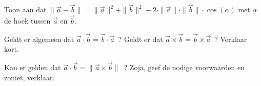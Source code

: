 \documentclass{ximera}
\begin{document}
\begin{exercise}
	Toon aan dat \( \| \vec{a} - \vec{b} \| = \|\vec{a}\|^2 + \|\vec{b}\|^2 - 2 \cdot \|\vec{a}\| \cdot \|\vec{b}\| \cdot \cos(\alpha)\) met \(\alpha\) de hoek tussen \(\vec{a}\) en \(\vec{b}\). 
\end{exercise}

\begin{exercise}
	Geldt er algemeen dat \(\vec{a} \cdot \vec{b} = \vec{b} \cdot \vec{a}\) \,? 
	Geldt er dat \(\vec{a} \times \vec{b} = \vec{b} \times \vec{a}\) \,? 
	Verklaar kort.
\end{exercise}

\begin{exercise}
	Kan er gelden dat \(\vec{a} \cdot \vec{b} = \| \vec{a} \times \vec{b} \|\) \,? 
	Zoja, geef de nodige voorwaarden en zoniet, verklaar. 
\end{exercise}
\end{document}
